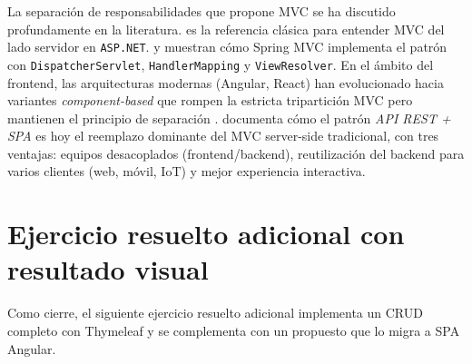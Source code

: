 \documentclass[11pt,a4paper,openany]{book}
\begin{document}
La separación de responsabilidades que propone MVC se ha discutido
profundamente en la literatura. \cite{galloway2011mvc} es la
referencia clásica para entender MVC del lado servidor en
\texttt{ASP.NET}. \cite{walls2022spring} y \cite{spilca2024spring}
muestran cómo Spring MVC implementa el patrón con
\texttt{DispatcherServlet}, \texttt{HandlerMapping} y
\texttt{ViewResolver}. En el ámbito del frontend, las arquitecturas
modernas (Angular, React) han evolucionado hacia variantes
\emph{component-based} que rompen la estricta tripartición MVC pero
mantienen el principio de separación
\cite{richards2020fundamentals}. \cite{richardson2007restful} documenta
cómo el patrón \emph{API REST + SPA} es hoy el reemplazo dominante
del MVC server-side tradicional, con tres ventajas: equipos
desacoplados (frontend/backend), reutilización del backend para
varios clientes (web, móvil, IoT) y mejor experiencia interactiva.

\section{Ejercicio resuelto adicional con resultado visual}

Como cierre, el siguiente ejercicio resuelto adicional
implementa un CRUD completo con Thymeleaf y se complementa con un
propuesto que lo migra a SPA Angular.
\end{document}
